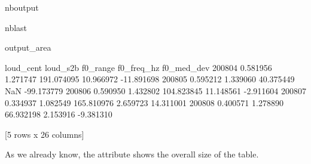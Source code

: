 \documentclass[letterpaper,10pt,english]{sphinxmanual}
\begin{document}
\begin{sphinxuseclass}{nboutput}
\begin{sphinxuseclass}{nblast}
{\begin{sphinxuseclass}{output_area}
\begin{sphinxuseclass}{}
\begin{sphinxVerbatim}[commandchars=\\\{\}]
       loud\_cent  loud\_s2b    f0\_range  f0\_freq\_hz  f0\_med\_dev
200804  0.581956  1.271747  191.074095   10.966972  -11.891698
200805  0.595212  1.339060   40.375449         NaN  -99.173779
200806  0.590950  1.432802  104.823845   11.148561   -2.911604
200807  0.334937  1.082549  165.810976    2.659723   14.311001
200808  0.400571  1.278890   66.932198    2.153916   -9.381310

[5 rows x 26 columns]
\end{sphinxVerbatim}



\end{sphinxuseclass}
\end{sphinxuseclass}
}

\end{sphinxuseclass}
\end{sphinxuseclass}
\sphinxAtStartPar
As we already know, the  attribute shows the overall size of the table.
\end{document}
